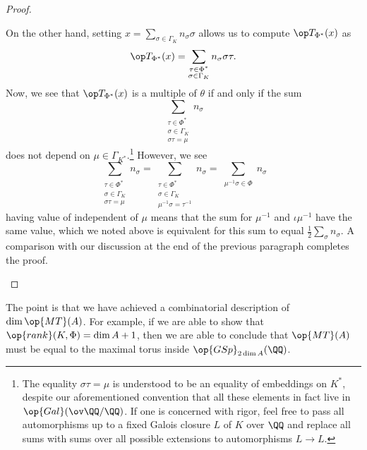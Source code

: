 \documentclass{article}
\begin{document}
\begin{proof}
\begin{enumerate}
		On the other hand, setting $x=\sum_{\sigma\in\Gamma_K}n_\sigma\sigma$ allows us to compute $\op T_{\Phi^*}(x)$ as
		\[\op T_{\Phi^*}(x)=\sum_{\substack{\tau\in\Phi^*\\\sigma\in\Gamma_K}}n_\sigma\sigma\tau.\]
		Now, we see that $\op T_{\Phi^*}(x)$ is a multiple of $\theta$ if and only if the sum
		\[\sum_{\substack{\tau\in\Phi^*\\\sigma\in\Gamma_K\\\sigma\tau=\mu}}n_\sigma\]
		does not depend on $\mu\in\Gamma_{K^*}$.\footnote{The equality $\sigma\tau=\mu$ is understood to be an equality of embeddings on $K^*$, despite our aforementioned convention that all these elements in fact live in $\op{Gal}(\ov\QQ/\QQ)$. If one is concerned with rigor, feel free to pass all automorphisms up to a fixed Galois closure $L$ of $K$ over $\QQ$ and replace all sums with sums over all possible extensions to automorphisms $L\to L$.} However, we see
		\[\sum_{\substack{\tau\in\Phi^*\\\sigma\in\Gamma_K\\\sigma\tau=\mu}}n_\sigma=\sum_{\substack{\tau\in\Phi^*\\\sigma\in\Gamma_K\\\mu^{-1}\sigma=\tau^{-1}}}n_\sigma=\sum_{\substack{\mu^{-1}\sigma\in\Phi}}n_\sigma\]
		having value of independent of $\mu$ means that the sum for $\mu^{-1}$ and $\iota\mu^{-1}$ have the same value, which we noted above is equivalent for this sum to equal $\frac12\sum_\sigma n_\sigma$. A comparison with our discussion at the end of the previous paragraph completes the proof.
		\qedhere
	\end{enumerate}
\end{proof}
The point is that we have achieved a combinatorial description of $\dim\op{MT}(A)$. For example, if we are able to show that $\op{rank}(K,\Phi)=\dim A+1$, then we are able to conclude that $\op{MT}(A)$ must be equal to the maximal torus inside $\op{GSp}_{2\dim A}(\QQ)$.
\end{document}
